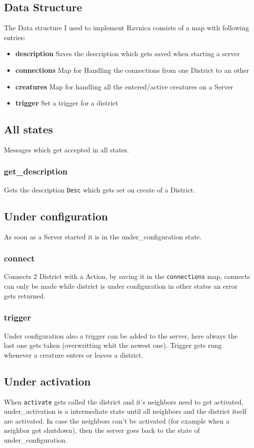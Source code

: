 \documentclass[12pt,a4paper]{article}
\begin{document}
\subsection{Data Structure}
The Data structure I used to implement Ravnica consists of a map with following entries:
\begin{itemize}
	\item \textbf{description} Saves the description which gets saved when starting a server
	\item \textbf{connections} Map for Handling the connections from one District to an other
	\item \textbf{creatures} Map for handling all the entered/active creatures on a Server
	\item \textbf{trigger} Set a trigger for a district
\end{itemize}

\subsection{All states}
Messages which get accepted in all states.
\subsubsection{get\_description}
Gets the description \texttt{Desc} which gets set on create of a District.

\subsection{Under configuration}
As soon as a Server started it is in the under\_configuration state.
\subsubsection{connect}
Connects 2 District with a Action, by saving it in the \texttt{connections} map, 
connects can only be made while district is under configuration in other states an error gets returned.

\subsubsection{trigger}
Under configuration also a trigger can be added to the server, here always the last one gets taken (overwritting whit the newest one).
Trigger gets rung whenever a creature enters or leaves a district.

\subsection{Under activation}
When \texttt{activate} gets called the district and it's neighbors need to get activated, under\_activation is a intermediate state until all neighbors and the district itself are activated.
In case the neighbors can't be activated (for example when a neighbor got shutdown), then the server goes back to the state of under\_configuration.
\end{document}
